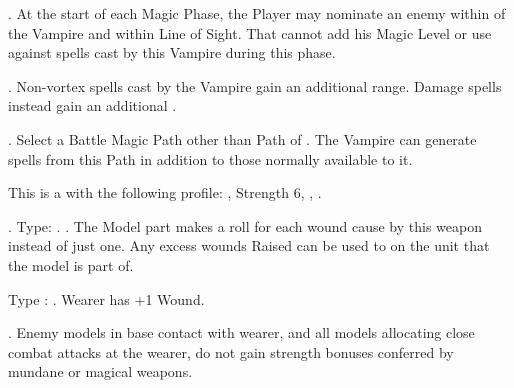 \startpricelist

 \textbf{\ancientbloodpower}. At the start of each Magic Phase, the Player may nominate an enemy \wizard{} within  of the Vampire and within Line of Sight. That \wizard{} cannot add his Magic Level or use \aideddispel{} against spells cast by this Vampire during this phase.

 \textbf{\bloodlinepower}. Non-vortex spells cast by the Vampire gain an additional  range. Damage spells instead gain an additional .

 \textbf{\bloodlinepower}. Select a Battle Magic Path other than Path of \nature . The Vampire can generate spells from this Path in addition to those normally available to it.

\endpricelist

\armymagicitems

\armymagicweapons

\startpricelist

 This is a \boltthrower{} \artilleryweapon{} with the following profile: , Strength 6, , .

 . Type: \hw . . The Model part makes a \vampiric{} roll for each  wound cause by this weapon instead of just one. Any excess wounds Raised can be used to \raisewounds{} on the unit that the model is part of.

\endpricelist

\armymagicarmor

\startpricelist

 Type : \platearmour . Wearer has +1 Wound.

\endpricelist

\armytalismans

\startpricelist

 . Enemy models in base contact with wearer, and all models allocating close combat attacks at the wearer, do not gain strength bonuses  conferred by mundane or magical weapons.

